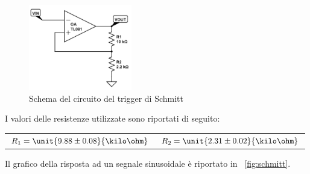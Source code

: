 \documentclass[10pt,a4paper]{article}
\begin{document}
\begin{figure}[H]
	\centering
	\includegraphics[width=0.40\textwidth]{../circuiti/schmitt_trigger.jpg}
	\caption{Schema del circuito del trigger di Schmitt}
	\label{fig:schmitt_trigger}
\end{figure}

I valori delle resistenze utilizzate sono riportati di seguito:

\begin{table}[H]
	\centering
	\begin{tabular}{cc}
        $ R_1 = \unit{9.88 \pm 0.08}{\kilo\ohm}$  & $R_2 = \unit{2.31 \pm 0.02}{\kilo\ohm}$
	\end{tabular}
\end{table}

Il grafico della risposta ad un segnale sinusoidale è riportato in \figurename{~\ref{fig:schmitt}}.
\end{document}

